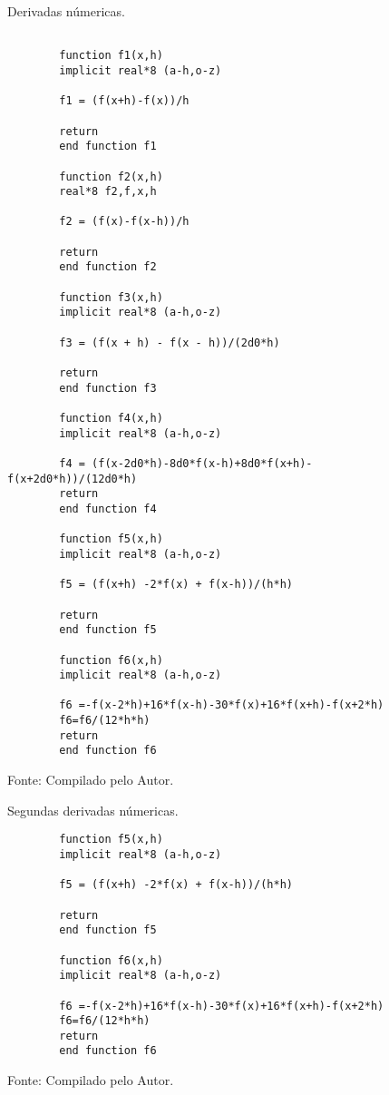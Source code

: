 \vspace*{1\baselineskip}

\begin{figure}[H]
\centering
\caption{Derivadas númericas.}
\centering

\begin{lstlisting}

        function f1(x,h)
        implicit real*8 (a-h,o-z)
        
        f1 = (f(x+h)-f(x))/h

        return
        end function f1

        function f2(x,h)
        real*8 f2,f,x,h

        f2 = (f(x)-f(x-h))/h

        return
        end function f2

        function f3(x,h)
        implicit real*8 (a-h,o-z)

        f3 = (f(x + h) - f(x - h))/(2d0*h)

        return
        end function f3

        function f4(x,h)
        implicit real*8 (a-h,o-z)

        f4 = (f(x-2d0*h)-8d0*f(x-h)+8d0*f(x+h)-f(x+2d0*h))/(12d0*h)
        return
        end function f4

        function f5(x,h)
        implicit real*8 (a-h,o-z)

        f5 = (f(x+h) -2*f(x) + f(x-h))/(h*h)

        return
        end function f5

        function f6(x,h)
        implicit real*8 (a-h,o-z)

        f6 =-f(x-2*h)+16*f(x-h)-30*f(x)+16*f(x+h)-f(x+2*h)
        f6=f6/(12*h*h)
        return
        end function f6
\end{lstlisting}

\caption*{Fonte: Compilado pelo Autor.}
\label{fig:tarefa 1 - Derivadas}
\end{figure}

\begin{figure}[H]
\centering
\caption{Segundas derivadas númericas.}
\centering

\begin{lstlisting}
        function f5(x,h)
        implicit real*8 (a-h,o-z)

        f5 = (f(x+h) -2*f(x) + f(x-h))/(h*h)

        return
        end function f5

        function f6(x,h)
        implicit real*8 (a-h,o-z)

        f6 =-f(x-2*h)+16*f(x-h)-30*f(x)+16*f(x+h)-f(x+2*h)
        f6=f6/(12*h*h)
        return
        end function f6
\end{lstlisting}

\caption*{Fonte: Compilado pelo Autor.}
\label{fig:tarefa 1 - Segundas derivadas}
\end{figure}


